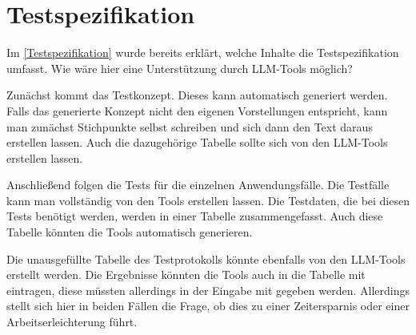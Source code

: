 \section{Testspezifikation}  \label{LLMTestspezifikation}

Im \autoref{Testspezifikation} wurde bereits erklärt, welche Inhalte die Testspezifikation umfasst. Wie wäre hier eine 
Unterstützung durch LLM-Tools möglich?

Zunächst kommt das Testkonzept. Dieses kann automatisch generiert werden. Falls das generierte Konzept nicht den 
eigenen Vorstellungen entspricht, kann man zunächst Stichpunkte selbst schreiben und sich dann den Text daraus 
erstellen lassen. Auch die dazugehörige Tabelle sollte sich von den LLM-Tools erstellen lassen.

Anschließend folgen die Tests für die einzelnen Anwendungsfälle. Die Testfälle kann man vollständig von den Tools 
erstellen lassen. Die Testdaten, die bei diesen Tests benötigt werden, werden in einer Tabelle zusammengefasst. 
Auch diese Tabelle könnten die Tools automatisch generieren.

Die unausgefüllte Tabelle des Testprotokolls könnte ebenfalls von den LLM-Tools erstellt werden. Die Ergebnisse 
könnten die Tools auch in die Tabelle mit eintragen, diese müssten allerdings in der Eingabe mit gegeben werden. 
Allerdings stellt sich hier in beiden Fällen die Frage, ob dies zu einer Zeitersparnis oder einer Arbeitserleichterung führt.